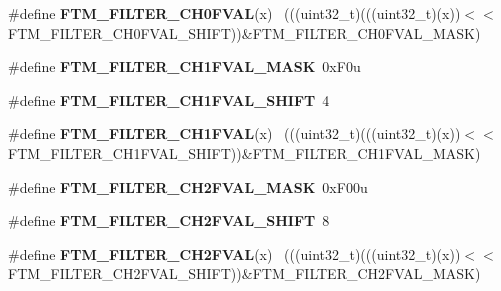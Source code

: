 \begin{DoxyCompactItemize}
\item 
\hypertarget{group___f_t_m___register___masks_gadc3c077e681f85811157cb396b0e3e36}{}\#define {\bfseries F\+T\+M\+\_\+\+F\+I\+L\+T\+E\+R\+\_\+\+C\+H0\+F\+V\+A\+L}(x)                                    ~(((uint32\+\_\+t)(((uint32\+\_\+t)(x))$<$$<$F\+T\+M\+\_\+\+F\+I\+L\+T\+E\+R\+\_\+\+C\+H0\+F\+V\+A\+L\+\_\+\+S\+H\+I\+F\+T))\&F\+T\+M\+\_\+\+F\+I\+L\+T\+E\+R\+\_\+\+C\+H0\+F\+V\+A\+L\+\_\+\+M\+A\+S\+K)\label{group___f_t_m___register___masks_gadc3c077e681f85811157cb396b0e3e36}

\item 
\hypertarget{group___f_t_m___register___masks_gae3c17178123eda4dedc1b20f4c6d331e}{}\#define {\bfseries F\+T\+M\+\_\+\+F\+I\+L\+T\+E\+R\+\_\+\+C\+H1\+F\+V\+A\+L\+\_\+\+M\+A\+S\+K}~0x\+F0u\label{group___f_t_m___register___masks_gae3c17178123eda4dedc1b20f4c6d331e}

\item 
\hypertarget{group___f_t_m___register___masks_gaed23e149091b6f6982050e2de4385584}{}\#define {\bfseries F\+T\+M\+\_\+\+F\+I\+L\+T\+E\+R\+\_\+\+C\+H1\+F\+V\+A\+L\+\_\+\+S\+H\+I\+F\+T}~4\label{group___f_t_m___register___masks_gaed23e149091b6f6982050e2de4385584}

\item 
\hypertarget{group___f_t_m___register___masks_gafde7f78c8e5aba0f5a7e17376350eac0}{}\#define {\bfseries F\+T\+M\+\_\+\+F\+I\+L\+T\+E\+R\+\_\+\+C\+H1\+F\+V\+A\+L}(x)                                    ~(((uint32\+\_\+t)(((uint32\+\_\+t)(x))$<$$<$F\+T\+M\+\_\+\+F\+I\+L\+T\+E\+R\+\_\+\+C\+H1\+F\+V\+A\+L\+\_\+\+S\+H\+I\+F\+T))\&F\+T\+M\+\_\+\+F\+I\+L\+T\+E\+R\+\_\+\+C\+H1\+F\+V\+A\+L\+\_\+\+M\+A\+S\+K)\label{group___f_t_m___register___masks_gafde7f78c8e5aba0f5a7e17376350eac0}

\item 
\hypertarget{group___f_t_m___register___masks_ga33bec78729047fa99f4534d68d36f696}{}\#define {\bfseries F\+T\+M\+\_\+\+F\+I\+L\+T\+E\+R\+\_\+\+C\+H2\+F\+V\+A\+L\+\_\+\+M\+A\+S\+K}~0x\+F00u\label{group___f_t_m___register___masks_ga33bec78729047fa99f4534d68d36f696}

\item 
\hypertarget{group___f_t_m___register___masks_ga9d2eef1684a2f4dbb28931408cf3248f}{}\#define {\bfseries F\+T\+M\+\_\+\+F\+I\+L\+T\+E\+R\+\_\+\+C\+H2\+F\+V\+A\+L\+\_\+\+S\+H\+I\+F\+T}~8\label{group___f_t_m___register___masks_ga9d2eef1684a2f4dbb28931408cf3248f}

\item 
\hypertarget{group___f_t_m___register___masks_gae251658b18243dba86b3230a55cde0ec}{}\#define {\bfseries F\+T\+M\+\_\+\+F\+I\+L\+T\+E\+R\+\_\+\+C\+H2\+F\+V\+A\+L}(x)                                    ~(((uint32\+\_\+t)(((uint32\+\_\+t)(x))$<$$<$F\+T\+M\+\_\+\+F\+I\+L\+T\+E\+R\+\_\+\+C\+H2\+F\+V\+A\+L\+\_\+\+S\+H\+I\+F\+T))\&F\+T\+M\+\_\+\+F\+I\+L\+T\+E\+R\+\_\+\+C\+H2\+F\+V\+A\+L\+\_\+\+M\+A\+S\+K)\label{group___f_t_m___register___masks_gae251658b18243dba86b3230a55cde0ec}


\end{DoxyCompactItemize}
